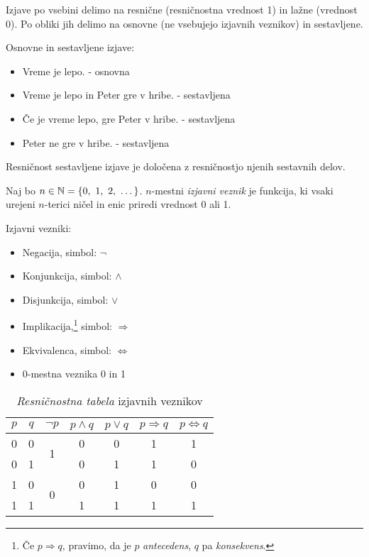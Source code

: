 \documentclass[12pt, a4paper]{article}
\renewcommand{\implies}{\Rightarrow}
\renewcommand{\iff}{\Leftrightarrow}
\begin{document}
Izjave po vsebini delimo na resnične (resničnostna vrednost 1) in lažne (vrednost 0). Po obliki jih delimo na osnovne (ne vsebujejo izjavnih veznikov) in sestavljene.

\begin{zgled}
Osnovne in sestavljene izjave:

\begin{itemize}
\item Vreme je lepo. - osnovna
\item Vreme je lepo in Peter gre v hribe. - sestavljena
\item Če je vreme lepo, gre Peter v hribe. - sestavljena
\item Peter ne gre v hribe. - sestavljena
\end{itemize}
\end{zgled}

Resničnost sestavljene izjave je določena z resničnostjo njenih sestavnih delov.

\begin{definicija}
Naj bo $n\in\mathbb{N}=\left\{0,~1,~2,~\dots\right\}$. $n$-mestni \emph{izjavni veznik} je funkcija, ki vsaki urejeni $n$-terici ničel in enic priredi vrednost 0 ali 1. 
\end{definicija}

\begin{zgled}
Izjavni vezniki:

\setlength{\columnsep}{-2cm}
\begin{multicols}{2}
\begin{itemize}
\item Negacija, simbol: $\neg$
\item Konjunkcija, simbol: $\land$
\item Disjunkcija, simbol: $\lor$
\item Implikacija,\footnote{Če $p\implies q$, pravimo, da je $p$ \emph{antecedens}, $q$ pa \emph{konsekvens}.} simbol: $\implies$
\item Ekvivalenca, simbol: $\iff$
\item 0-mestna veznika 0 in 1
\end{itemize}

\columnbreak
\begin{table}[H]
\centering
\begin{tabular}{c|c|c|c|c|c|c}
$p$ & $q$ & $\neg p$ & $p\land q$ & $p\lor q$ & $p\implies q$ & $p\iff q$ \\
\hline 
0 & 0 & \multirow{2}{*}{1} & 0 & 0 & 1 & 1 \\
\cline{1-2}\cline{4-7} 
0 & 1 &  & 0 & 1 & 1 & 0 \\
\hline 
1 & 0 & \multirow{2}{*}{0} & 0 & 1 & 0 & 0 \\
\cline{1-2}\cline{4-7} 
1 & 1 &  & 1 & 1 & 1 & 1
\end{tabular}
\caption{\emph{Resničnostna tabela} izjavnih veznikov}
\end{table}
\end{multicols}
\setlength{\columnsep}{10pt}
\end{zgled}
\end{document}
